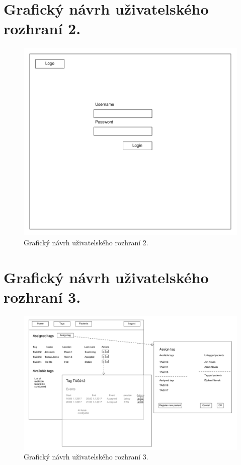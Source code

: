 \documentclass[czech,master,public,dept450,male,oneside, hidelinks]{diploma}
\begin{document}
	\section{Grafický návrh uživatelského rozhraní 2.}
	\begin{figure}[H]
		\centering
		\includegraphics[width=16cm]{Appendix/src/Login.pdf}
		\caption{Grafický návrh uživatelského rozhraní 2.}
	\end{figure}
	
	\section{Grafický návrh uživatelského rozhraní 3.}
	\begin{figure}[H]
		\centering
		\includegraphics[width=16cm]{Appendix/src/Tags.pdf}
		\caption{Grafický návrh uživatelského rozhraní 3.}
	\end{figure}
	
\end{document}
